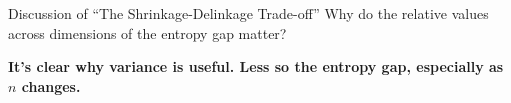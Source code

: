 \documentclass[8pt]{beamer}\usepackage[]{graphicx}\usepackage[]{color}
\begin{document}
\begin{frame}{Discussion of ``The Shrinkage-Delinkage Trade-off''}
\pause
Why do the relative values across dimensions of the entropy gap matter?

\textbf{It's clear why variance is useful.  Less so the entropy gap,
especially as $n$ changes.}




\end{frame}






    
%     
%     
    
\end{document}
